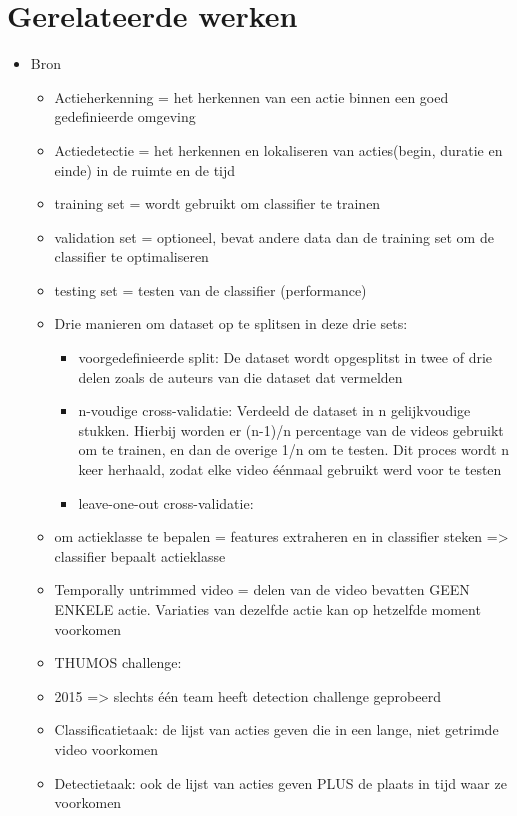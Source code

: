 \chapter{Gerelateerde werken}

\begin{itemize}
		\item Bron \cite{Review-of-Action-Recognition-and-Detection-Methods}
	\begin{itemize}
		\item Actieherkenning = het herkennen van een actie binnen een goed gedefinieerde omgeving 
		\item Actiedetectie = het herkennen en lokaliseren van acties(begin, duratie en einde) in de ruimte en de tijd
		\item training set = wordt gebruikt om classifier te trainen
		\item validation set = optioneel, bevat andere data dan de training set om de classifier te optimaliseren
		\item testing set = testen van de classifier (performance)
		\item Drie manieren om dataset op te splitsen in deze drie sets:
		\begin{itemize}
			\item voorgedefinieerde split: De dataset wordt opgesplitst  in twee of drie delen zoals de auteurs van die dataset dat vermelden
			\item n-voudige cross-validatie: Verdeeld de dataset in n gelijkvoudige stukken. Hierbij worden er (n-1)/n  percentage van de videos gebruikt om te trainen, en dan de overige 1/n om te testen. Dit proces wordt n keer herhaald, zodat elke video éénmaal gebruikt werd voor te testen
			\item leave-one-out cross-validatie:
		\end{itemize}
		
		
		\item  om actieklasse te bepalen = features extraheren en in classifier steken => classifier bepaalt actieklasse
		\item Temporally untrimmed video = delen van de video bevatten GEEN ENKELE actie. Variaties van dezelfde actie kan op hetzelfde moment voorkomen
		
		\item THUMOS challenge:
		\item 2015 => slechts één team heeft detection challenge geprobeerd
		
		\item 	Classificatietaak: de lijst van acties geven die in een lange, niet getrimde video voorkomen
		\item 	Detectietaak: ook de lijst van acties geven PLUS de plaats in tijd waar ze voorkomen
	\end{itemize}


\end{itemize}
